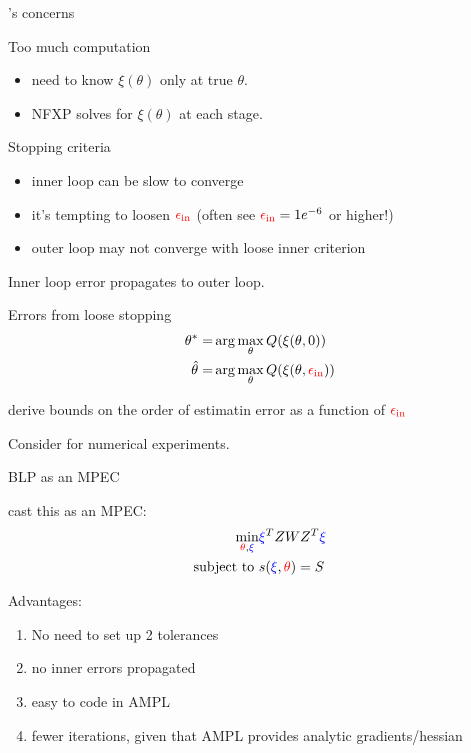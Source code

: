 \documentclass[english]{beamer}
\begin{document}
\begin{frame}{\cite{dube2012improving}'s concerns}
\begin{mide}
\item Too much computation
\begin{itemize}
\item need to know $\xi(\theta)$ only at true $\theta$.
\item NFXP solves for $\xi(\theta)$ at each stage.
\end{itemize}
\item Stopping criteria
\begin{itemize}
\item inner loop can be slow to converge
\item it's tempting to loosen ${\color{red}{\epsilon_\text{in}}}$ (often see ${\color{red}{\epsilon_\text{in}}}=1e^{-6}$ or higher!)
\item outer loop may not converge with loose inner criterion
\end{itemize}
\item Inner loop error propagates to outer loop.
\end{mide}
\end{frame}

\begin{frame}{Errors from loose stopping}
\begin{align*}	
\theta^* = & \arg \max_{\theta} Q(\xi(\theta,0)) \\
\hat{\theta} = & \arg \max_{\theta} Q(\xi(\theta,{\color{red}{\epsilon_\text{in}}})) 
\end{align*}	
\begin{midi}
\item \cite{dube2012improving} derive bounds on the order of estimatin error as a function of ${\color{red}{\epsilon_\text{in}}}$
\item Consider \cite{knittel2014estimation} for numerical experiments.
\end{midi}
\end{frame}

\begin{frame}{BLP as an MPEC}
\begin{midi}
\item \cite{dube2012improving} cast this as an MPEC:
\begin{align*}
\min_{{\color{red}{\theta}},{\color{blue}{\xi}}} & {\color{blue}{\xi}}^T ZWZ^T{\color{blue}{\xi}} \\
\text{subject to } & s({\color{blue}{\xi}},{\color{red}{\theta}}) = S
\end{align*}
\item Advantages:
\begin{enumerate}
\item No need to set up 2 tolerances
\item no inner errors propagated
\item easy to code in AMPL
\item fewer iterations, given that AMPL provides analytic gradients/hessian
\end{enumerate}
\end{midi}
\end{frame}
\end{document}
